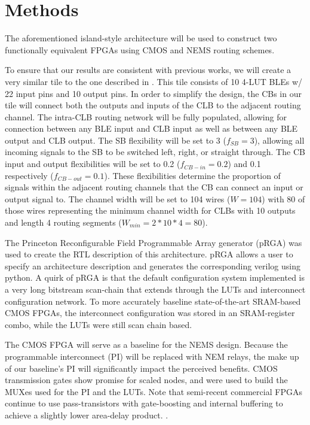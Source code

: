\documentclass[twoside,twocolumn]{article}
\begin{document}

\section{Methods}\label{sec:methods}
The aforementioned island-style architecture will be used to construct two functionally equivalent FPGAs using CMOS and NEMS routing schemes.

To ensure that our results are consistent with previous works, we
will create a very similar tile to the one described in \cite{chen_efficient_2010}. 
This tile consists of 10 4-LUT BLEs w/ 22 input pins and 10 output pins.
In order to simplify the design, the CBs in our tile will connect both
the outputs and inputs of the CLB to the adjacent routing channel.
The intra-CLB routing network will be fully populated, allowing for connection 
between any BLE input and CLB input as well as between any BLE output and CLB output.
The SB flexibility will be set to 3 ($f_{SB} = 3$), allowing all 
incoming signals to the SB to be switched left, right, or straight through. 
The CB input and output flexibilities will be set to 0.2 ($f_{CB-in} = 0.2$) 
and 0.1 respectively ($f_{CB-out} = 0.1$). These flexibilities determine the 
proportion of signals within the adjacent routing channels that the CB can 
connect an input or output signal to. The channel width will be set to 104 wires
($W=104$) with 80 of those wires representing the minimum channel width for 
CLBs with 10 outputs and length 4 routing segments ($W_{min} = 2 * 10 * 4 = 80$).


The Princeton Reconfigurable Field Programmable Array generator (pRGA) 
was used to create the RTL description of this architecture.
pRGA allows a user to specify an architecture description and 
generates the corresponding verilog using python. A quirk of 
pRGA is that the default configuration system implemented is 
a very long bitstream scan-chain that extends through the LUTs 
and interconnect configuration network. To more accurately baseline 
state-of-the-art SRAM-based CMOS FPGAs, the interconnect configuration 
was stored in an SRAM-register combo, while the LUTs were still scan chain based.

The CMOS FPGA will serve as a baseline for the NEMS design.
Because the programmable interconnect (PI) will be replaced with NEM relays, the make up
of our baseline's PI will significantly impact the perceived benefits. 
CMOS transmission gates show promise for scaled nodes, and were used to build the MUXes used 
for the PI and the LUTs. Note that semi-recent commercial FPGAs continue to use pass-transistors with gate-boosting and internal buffering
to achieve a slightly lower area-delay product. \cite{chiasson_should_2013}.
\end{document}
